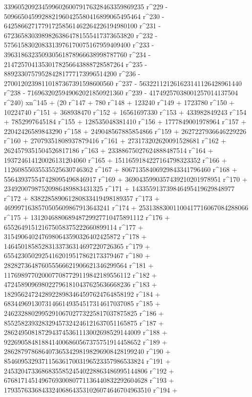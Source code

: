        33960520923459960260079176328463359869235 r^229 - 
       5096650459928821960425580416899065495464 r^230 - 
       642586627177917258561462264226194980100 r^231 - 
       67236583039898263864781555417373653820 r^232 - 
       5756158302083313976170075167959409400 r^233 - 
       396318632350930561878966638998787760 r^234 - 
       21472570413530178256643888728587264 r^235 - 
       889233075795284281777173996514200 r^236 - 
       27001202398110187367391598600560 r^237 - 
       563221121261623141126428961440 r^238 - 
       7169632025949062021850921360 r^239 - 
       41749257038001257014137504 r^240) xn^145 + (20 r^147 + 
       780 r^148 + 123240 r^149 + 1723780 r^150 + 10224740 r^151 + 
       368938470 r^152 + 16561697330 r^153 + 433982849243 r^154 + 
       7852997645184 r^155 + 128535048381410 r^156 + 
       1777849001978964 r^157 + 22042426589843290 r^158 + 
       249048567885854866 r^159 + 2627227936646229226 r^160 + 
       27079351808937879416 r^161 + 273173202620091528681 r^162 + 
       2624579351504526817186 r^163 + 23388675027624888487514 r^164 + 
       193724614120026131204060 r^165 + 
       1511659184227164798323352 r^166 + 
       11260855035535525630746362 r^167 + 
       80671358406929843341796460 r^168 + 
       556439375547428095496846917 r^169 + 
       3690435990357439210201978951 r^170 + 
       23492007987520986489883431325 r^171 + 
       143355913739846495419629848977 r^172 + 
       838228589061280833419498189357 r^173 + 
       4699971638570505609867913643241 r^174 + 
       25313883001100417716067084288066 r^175 + 
       131204688068948729927710475891112 r^176 + 
       655264915121675058375222660899114 r^177 + 
       3154906402476980643590326402425872 r^178 + 
       14645018585283133736314697220726365 r^179 + 
       65542305029254162019517862173379467 r^180 + 
       282827364876055566621906621346299564 r^181 + 
       1176989770200077087729119842189556112 r^182 + 
       4724589096980227961810437625636668236 r^183 + 
       18295624724289228983464597624764858192 r^184 + 
       68344969130731466149354517314617037085 r^185 + 
       246232880299529106702773225817037875825 r^186 + 
       855258239328329457324246121637051165875 r^187 + 
       2862495081872943745361113002698529144009 r^188 + 
       9226905848188414006860567375751914458652 r^189 + 
       28628797868640736534298198296908428199240 r^190 + 
       85460953293711563617003196523357986533824 r^191 + 
       245320473368683558524540228863486995144806 r^192 + 
       676817145149676930080771136440832292604628 r^193 + 
       1793576336843324068643531026074646704963510 r^194 + 
